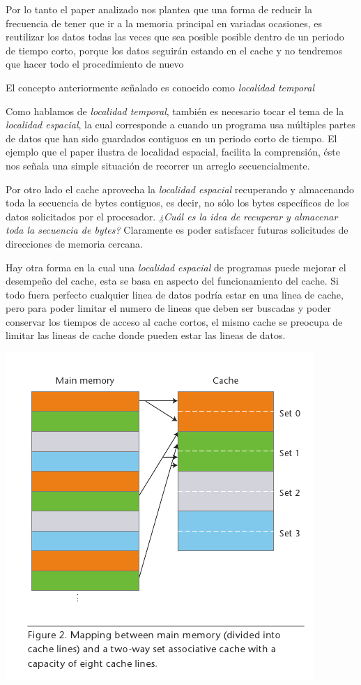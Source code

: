 Por lo tanto el paper analizado nos plantea que una forma de reducir la frecuencia de tener que ir a la memoria principal en variadas ocasiones,
es reutilizar los datos todas las veces que sea posible posible dentro de un periodo de tiempo corto,
porque los datos seguirán estando en el cache y no tendremos que hacer todo el procedimiento de nuevo

El concepto anteriormente señalado es conocido como \emph{localidad temporal}

Como hablamos de \emph{localidad temporal},
también es necesario tocar el tema de la \emph{localidad espacial},
la cual corresponde a cuando un programa usa múltiples partes de datos que han sido guardados contiguos en un periodo corto de tiempo.
El ejemplo que el paper ilustra de localidad espacial,
facilita la comprensión, éste nos señala una simple situación de recorrer un arreglo secuencialmente.

Por otro lado el cache aprovecha la \emph{localidad espacial} recuperando y almacenando toda la secuencia de bytes contiguos,
es decir, no sólo los bytes específicos de los datos solicitados por el procesador.
\emph{¿Cuál es la idea de recuperar y almacenar toda la secuencia de bytes?}
Claramente es poder satisfacer futuras solicitudes de direcciones de memoria cercana.

Hay otra forma en la cual una \emph{localidad espacial} de programas puede mejorar el desempeño del cache,
esta se basa en aspecto del funcionamiento del cache.
Si todo fuera perfecto cualquier linea de datos podría estar en una linea de cache,
pero para poder limitar el numero de lineas que deben ser buscadas y poder conservar los tiempos de acceso al cache cortos,
el mismo cache se preocupa de limitar las lineas de cache donde pueden estar las lineas de datos.

\begin{center}
	\includegraphics[scale=0.7]{images/figura2}
\end{center}

